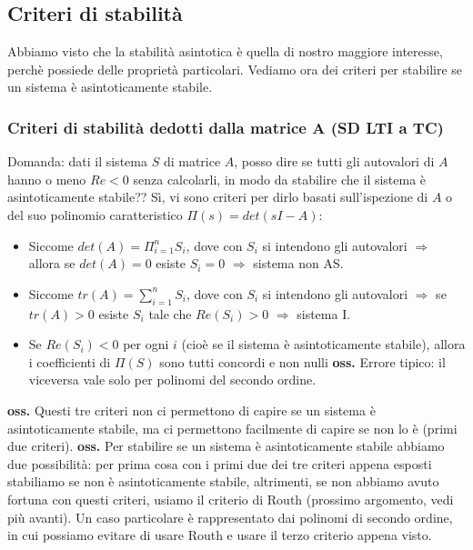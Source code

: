 \subsection{Criteri di stabilità}
Abbiamo visto che la stabilità asintotica è quella di nostro maggiore interesse, perchè possiede delle proprietà particolari. Vediamo ora dei criteri per stabilire se un sistema è asintoticamente stabile.
\subsubsection{Criteri di stabilità dedotti dalla matrice A (SD LTI a TC)}
Domanda: dati il sistema $S$ di matrice $A$, posso dire se tutti gli autovalori di $A$ hanno o meno $Re <0$ senza calcolarli, in modo da stabilire che il sistema è asintoticamente stabile??\newline
\newline
Sì, vi sono criteri per dirlo basati sull'ispezione di $A$ o del suo polinomio caratteristico $\Pi(s) = det (sI-A)$:
\begin{itemize}
    \item Siccome $det(A) = \Pi_{i=1}^{n}S_i$, dove con $S_i$ si intendono gli autovalori $\Longrightarrow$ allora se $det(A) = 0$ esiste $S_i = 0$ $\Longrightarrow$ sistema non AS.
    \item Siccome $tr(A) = \sum_{i=1}^{n}S_i$, dove con $S_i$ si intendono gli autovalori $\Longrightarrow$ se $tr(A) >0$ esiste $S_i$ tale che $Re(S_i) > 0$ $\Longrightarrow$ sistema I.
    \item Se $Re(S_i)<0$ per ogni $i$ (cioè se il sistema è asintoticamente stabile), allora i coefficienti di $\Pi(S)$ sono tutti concordi e non nulli \newline
    \textbf{oss.} Errore tipico: il viceversa vale solo per polinomi del secondo ordine.
\end{itemize}
\textbf{oss.}  Questi tre criteri non ci permettono di capire se un sistema è asintoticamente stabile, ma ci permettono facilmente di capire se non lo è (primi due criteri).\newline
\newline
\textbf{oss.} Per stabilire se un sistema è asintoticamente stabile abbiamo due possibilità: per prima cosa con i primi due dei tre criteri appena esposti stabiliamo se non è asintoticamente stabile, altrimenti, se non abbiamo avuto fortuna con questi criteri, usiamo il criterio di Routh (prossimo argomento, vedi più avanti). Un caso particolare è rappresentato dai polinomi di secondo ordine, in cui possiamo evitare di usare Routh e usare il terzo criterio appena visto.